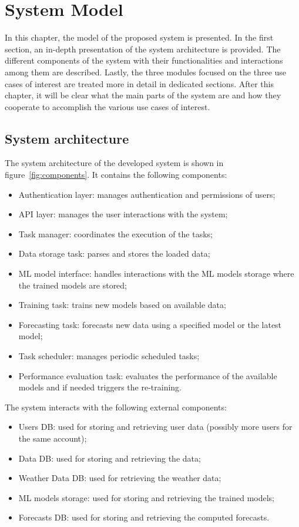 \chapter{System Model}
\label{cha:system}
\vspace{0.4 cm}

In this chapter, the model of the proposed system is presented.
In the first section, an in-depth presentation of the system architecture is provided.
The different components of the system with their functionalities and interactions among them are described.
Lastly, the three modules focused on the three use cases of interest are treated more in detail in dedicated sections.
After this chapter, it will be clear what the main parts of the system are and how they cooperate to accomplish the various use cases of interest.


\section{System architecture}
\label{sec:architecture}
\vspace{0.2 cm}

The system architecture of the developed system is shown in figure~\ref{fig:components}.
It contains the following components:
\begin{itemize}
  \item Authentication layer: manages authentication and permissions of users;
  \item API layer: manages the user interactions with the system;
  \item Task manager: coordinates the execution of the tasks;
  \item Data storage task: parses and stores the loaded data;
  \item ML model interface: handles interactions with the ML models storage where the trained models are stored;
  \item Training task: trains new models based on available data;
  \item Forecasting task: forecasts new data using a specified model or the latest model;
  \item Task scheduler: manages periodic scheduled tasks;
  \item Performance evaluation task: evaluates the performance of the available models and if needed triggers the re-training.
\end{itemize}

The system interacts with the following external components:
\begin{itemize}
  \item Users DB: used for storing and retrieving user data (possibly more users for the same account);
  \item Data DB: used for storing and retrieving the data;
  \item Weather Data DB: used for retrieving the weather data;
  \item ML models storage: used for storing and retrieving the trained models;
  \item Forecasts DB: used for storing and retrieving the computed forecasts.
\end{itemize}

